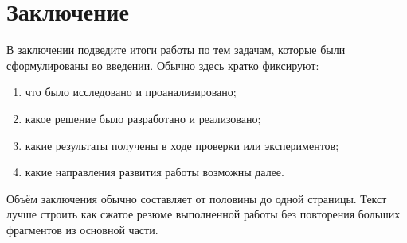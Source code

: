 \chapter*{Заключение}

В заключении подведите итоги работы по тем задачам, которые были сформулированы
во введении. Обычно здесь кратко фиксируют:
\begin{enumerate}
\item что было исследовано и проанализировано;
\item какое решение было разработано и реализовано;
\item какие результаты получены в ходе проверки или экспериментов;
\item какие направления развития работы возможны далее.
\end{enumerate}

Объём заключения обычно составляет от половины до одной страницы. Текст лучше
строить как сжатое резюме выполненной работы без повторения больших фрагментов
из основной части.
